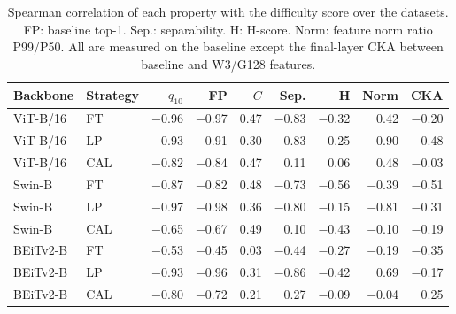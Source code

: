 \begin{table}[h]
\centering
\caption{Spearman correlation of each property with the difficulty score over the {} datasets. FP: baseline top-1. Sep.: separability. H: H-score. Norm: feature norm ratio P99/P50. All are measured on the baseline except the final-layer CKA between baseline and W3/G128 features.}
\label{tab:properties}
\setlength{\tabcolsep}{1.5pt}
\footnotesize
\begin{tabular}{llrrrrrrr}
\toprule
Backbone & Strategy & $q_{10}$ & FP & $C$ & Sep. & H & Norm & CKA \\
\midrule
ViT-B/16 & FT & $-$0.96 & $-$0.97 & 0.47 & $-$0.83 & $-$0.32 & 0.42 & $-$0.20 \\
ViT-B/16 & LP & $-$0.93 & $-$0.91 & 0.30 & $-$0.83 & $-$0.25 & $-$0.90 & $-$0.48 \\
ViT-B/16 & CAL & $-$0.82 & $-$0.84 & 0.47 & 0.11 & 0.06 & 0.48 & $-$0.03 \\
Swin-B & FT & $-$0.87 & $-$0.82 & 0.48 & $-$0.73 & $-$0.56 & $-$0.39 & $-$0.51 \\
Swin-B & LP & $-$0.97 & $-$0.98 & 0.36 & $-$0.80 & $-$0.15 & $-$0.81 & $-$0.31 \\
Swin-B & CAL & $-$0.65 & $-$0.67 & 0.49 & 0.10 & $-$0.43 & $-$0.10 & $-$0.19 \\
BEiTv2-B & FT & $-$0.53 & $-$0.45 & 0.03 & $-$0.44 & $-$0.27 & $-$0.19 & $-$0.35 \\
BEiTv2-B & LP & $-$0.93 & $-$0.96 & 0.31 & $-$0.86 & $-$0.42 & 0.69 & $-$0.17 \\
BEiTv2-B & CAL & $-$0.80 & $-$0.72 & 0.21 & 0.27 & $-$0.09 & $-$0.04 & 0.25 \\
\bottomrule
\end{tabular}
\end{table}
